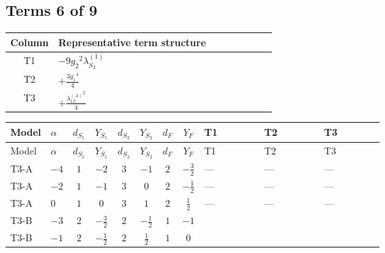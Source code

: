 \documentclass[8pt]{article}
\begin{document}
\begin{landscape}
\subsection*{Terms 6 of 9}
\begin{center}
\begin{tabular}{@{}c >{\raggedright\arraybackslash}p{0.82\linewidth}@{}}
\toprule
Column & Representative term structure \\
\midrule
T1 & \(\displaystyle -9 {g_2}^2 {\lambda_{S_2}^{(1)}}\) \\
\midrule
T2 & \(\displaystyle +\frac{3 {g_1}^4}{4}\) \\
\midrule
T3 & \(\displaystyle +\frac{{\lambda_{12}^{(A)}}^2}{4}\) \\
\midrule
\bottomrule
\end{tabular}
\end{center}
\smallskip
\tiny
\begin{longtable}{@{}llcccccc >{\raggedright\arraybackslash}p{0.21\linewidth} >{\raggedright\arraybackslash}p{0.21\linewidth} >{\raggedright\arraybackslash}p{0.21\linewidth}@{}}
\toprule
Model & $\alpha$ & $d_{S_1}$ & $Y_{S_1}$ & $d_{S_2}$ & $Y_{S_2}$ & $d_F$ & $Y_F$ & T1 & T2 & T3 \\
\midrule
\endfirsthead
\toprule
Model & $\alpha$ & $d_{S_1}$ & $Y_{S_1}$ & $d_{S_2}$ & $Y_{S_2}$ & $d_F$ & $Y_F$ & T1 & T2 & T3 \\
\midrule
\endhead
T3-A & $-4$ & $1$ & $-2$ & $3$ & $-1$ & $2$ & $-\frac{3}{2}$ & --- & --- & --- \\
\midrule
T3-A & $-2$ & $1$ & $-1$ & $3$ & $0$ & $2$ & $-\frac{1}{2}$ & --- & --- & --- \\
\midrule
T3-A & $0$ & $1$ & $0$ & $3$ & $1$ & $2$ & $\frac{1}{2}$ & --- & --- & --- \\
\midrule
T3-B & $-3$ & $2$ & $-\frac{3}{2}$ & $2$ & $-\frac{1}{2}$ & $1$ & $-1$ & \scriptsize\adjustbox{max width=\linewidth}{$\begin{gathered} -9 {g_2}^2 {\lambda_{S_2}^{(1)}}\end{gathered}$} & \scriptsize\adjustbox{max width=\linewidth}{$\begin{gathered} +\frac{3 {g_1}^4}{4}\end{gathered}$} & \scriptsize\adjustbox{max width=\linewidth}{$\begin{gathered} +\frac{{\lambda_{12}^{(A)}}^2}{4}\end{gathered}$} \\
\midrule
T3-B & $-1$ & $2$ & $-\frac{1}{2}$ & $2$ & $\frac{1}{2}$ & $1$ & $0$ & \scriptsize\adjustbox{max width=\linewidth}{$\begin{gathered} -9 {g_2}^2 {\lambda_{S_2}^{(1)}}\end{gathered}$} & \scriptsize\adjustbox{max width=\linewidth}{$\begin{gathered} +\frac{3 {g_1}^4}{4}\end{gathered}$} & \scriptsize\adjustbox{max width=\linewidth}{$\begin{gathered} +\frac{{\lambda_{12}^{(A)}}^2}{4}\end{gathered}$} \\

\end{longtable}
\end{landscape}
\end{document}
